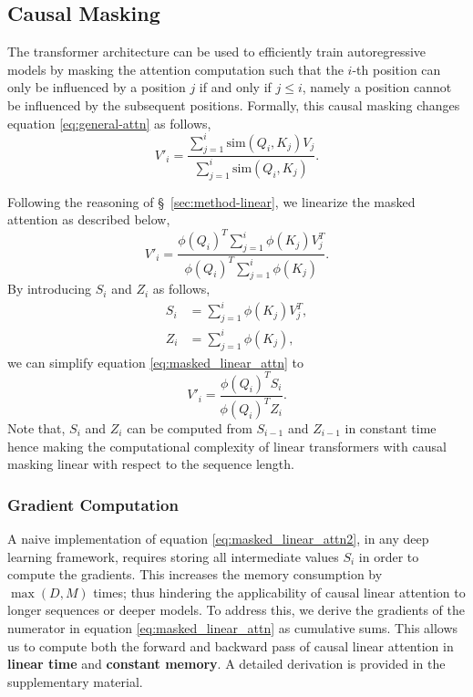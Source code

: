 \documentclass{article}
\newcommand{\similarity}[1]{\text{sim}\left(#1\right)}
\newcommand{\fe}[1]{\phi\left(#1\right)}
\begin{document}
\subsection{Causal Masking} \label{sec:method-masking}

The transformer architecture can be used to efficiently train autoregressive models
by masking the attention computation such that the $i$-th position
can only be influenced by a position $j$ if and only if $j \leq i$, namely a
position cannot be influenced by the subsequent positions. Formally, this
causal masking changes equation \ref{eq:general-attn} as follows,
\begin{equation}
    V'_i = \frac{\sum_{j=1}^i \similarity{Q_i, K_j} V_j}
                {\sum_{j=1}^i \similarity{Q_i, K_j}}.
    \label{eq:masked_attn}
\end{equation}

Following the reasoning of \S~\ref{sec:method-linear}, we linearize the
masked attention as described below,
\begin{equation}
    V'_i = \frac{\fe{Q_i}^T \sum_{j=1}^i \fe{K_j} V_j^T}
                 {\fe{Q_i}^T \sum_{j=1}^i \fe{K_j}}.
    \label{eq:masked_linear_attn}
\end{equation}
By introducing $S_i$ and $Z_i$ as follows,
\begin{align}
    S_i &= \sum_{j=1}^i \fe{K_j} V_j^T, \label{eq:attn_state} \\
    Z_i &= \sum_{j=1}^i \fe{K_j},
\end{align}
we can simplify equation \ref{eq:masked_linear_attn} to
\begin{equation}
    V'_i = \frac{\fe{Q_i}^T S_i}
                {\fe{Q_i}^T Z_i}.
    \label{eq:masked_linear_attn2}
\end{equation}
Note that, $S_i$ and $Z_i$ can be computed from $S_{i-1}$ and $Z_{i-1}$ in
constant time hence making the computational complexity of linear transformers
with causal masking linear with respect to the sequence length.

\subsubsection{Gradient Computation}

A naive implementation of equation \ref{eq:masked_linear_attn2}, in any deep
learning framework, requires storing all intermediate values $S_i$ in order to
compute the gradients. This increases the memory consumption by $\max\left(D,
M\right)$ times; thus hindering the applicability of causal linear attention to
longer sequences or deeper models. To address this, we derive the gradients of the numerator in
equation \ref{eq:masked_linear_attn} as cumulative sums. This allows us to
compute both the forward and backward pass of causal linear attention in
\textbf{linear time} and \textbf{constant memory}. A detailed derivation is
provided in the supplementary material.
\end{document}
